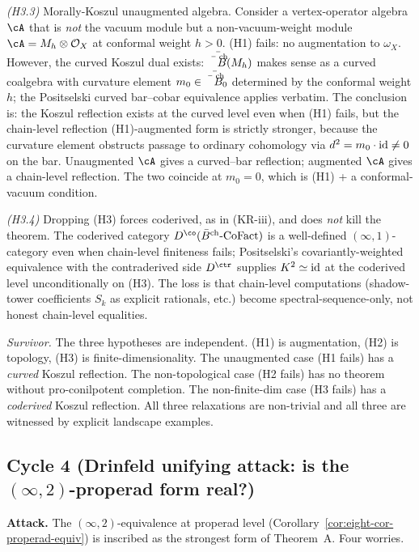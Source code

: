 \emph{(H3.3)} Morally-Koszul unaugmented algebra. Consider a
vertex-operator algebra $\cA$ that is \emph{not} the vacuum module
but a non-vacuum-weight module
$\cA = M_{h}\otimes\mathcal{O}_{X}$ at conformal weight $h>0$.
(H1) fails: no augmentation to $\omega_X$. However, the curved
Koszul dual exists: $\bar{\bar{B}^{\mathrm{ch}}}(M_{h})$ makes sense as a curved
coalgebra with curvature element $m_{0}\in\bar{\bar{B}^{\mathrm{ch}}}_{0}$
determined by the conformal weight $h$; the Positselski curved
bar--cobar equivalence \cite[Thm.\ 9.1]{Positselski2018} applies
verbatim. The conclusion is: the Koszul reflection exists at the
curved level even when (H1) fails, but the chain-level reflection
(H1)-augmented form is strictly stronger, because the curvature
element obstructs passage to ordinary cohomology via
$d^{2}=m_{0}\cdot\mathrm{id}\neq 0$ on the bar. Unaugmented $\cA$ gives a
curved--bar reflection; augmented $\cA$ gives a chain-level
reflection. The two coincide at $m_{0}=0$, which is (H1) + a
conformal-vacuum condition.

\emph{(H3.4)} Dropping (H3) forces coderived, as in (KR-iii), and does
\emph{not} kill the theorem. The coderived category
$D^{\co}(\Bbarch\text{-CoFact})$ is a well-defined
$(\infty,1)$-category even when chain-level finiteness fails;
Positselski's covariantly-weighted equivalence with the contraderived
side $D^{\ctr}$ supplies $K^{2}\simeq\mathrm{id}$ at the coderived level
unconditionally on (H3). The loss is that chain-level computations
(shadow-tower coefficients $S_{k}$ as explicit rationals, etc.) become
spectral-sequence-only, not honest chain-level equalities.

\emph{Survivor.} The three hypotheses are independent. (H1) is
augmentation, (H2) is topology, (H3) is finite-dimensionality. The
unaugmented case (H1 fails) has a \emph{curved} Koszul reflection.
The non-topological case (H2 fails) has no theorem without
pro-conilpotent completion. The non-finite-dim case (H3 fails) has a
\emph{coderived} Koszul reflection. All three relaxations are
non-trivial and all three are witnessed by explicit landscape
examples.

\subsection*{Cycle 4 (Drinfeld unifying attack: is the $(\infty,2)$-properad form real?)}

\textbf{Attack.} The $(\infty,2)$-equivalence at properad level
(Corollary~\ref{cor:eight-cor-properad-equiv}) is inscribed as the
strongest form of Theorem~A. Four worries.

